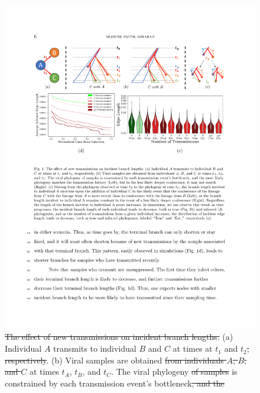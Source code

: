 \documentclass[a4paper,11pt]{article}
\providecommand{\DIFadd}[1]{{\protect\color{blue}\uwave{#1}}} %
\providecommand{\DIFdel}[1]{{\protect\color{red}\sout{#1}}}                      %
\providecommand{\DIFaddFL}[1]{\DIFadd{#1}} %
\providecommand{\DIFdelFL}[1]{\DIFdel{#1}} %
\providecommand{\DIFaddbeginFL}{} %
\providecommand{\DIFdelbeginFL}{} %
\providecommand{\DIFdelendFL}{} %
\begin{document}
\begin{figure}[!tp]
\centering
\includegraphics[width=\textwidth]{figs/Fig1.pdf}
\caption{\DIFdelbeginFL \DIFdelFL{The effect of new transmissions on incident branch lengths. }\DIFdelendFL  (a) Individual $A$ transmits to individual $B$ and $C$ at times at  $t_1$ and $t_2$\DIFdelbeginFL \DIFdelFL{, respectively}\DIFdelendFL . (b) Viral samples are obtained \DIFdelbeginFL \DIFdelFL{from individuals $A$, $B$, and $C$ }\DIFdelendFL %
at times $t_A$, $t_B$, and $t_C$. The viral phylogeny \DIFdelbeginFL \DIFdelFL{of samples }\DIFdelendFL is constrained by each transmission event's bottleneck\DIFdelbeginFL \DIFdelFL{, and the }\DIFdelendFL \DIFaddbeginFL \DIFaddFL{.
}}
\end{figure}
\end{document}
